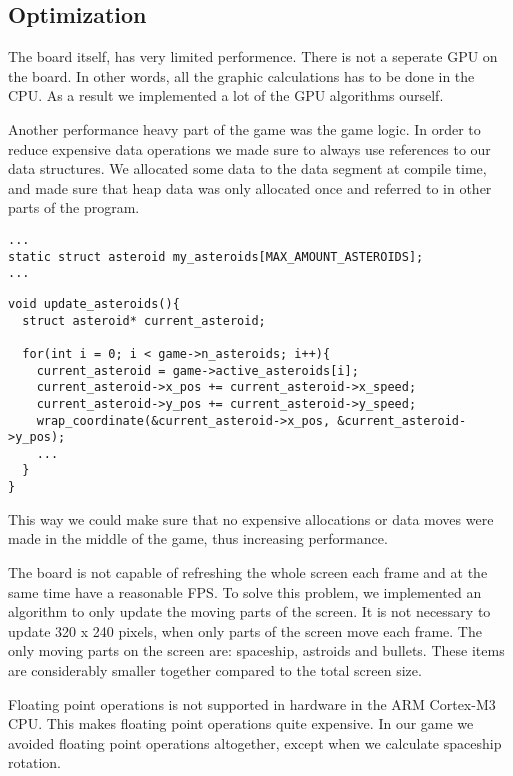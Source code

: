 \subsection{Optimization}
The board itself, has very limited performence. There is not a seperate GPU on the board. In other words, all the graphic calculations has to be done in the CPU. As a result we implemented a lot of the GPU algorithms ourself. 

Another performance heavy part of the game was the game logic. In order to reduce expensive data operations we made sure to always use references to our data structures. We allocated some data to the data segment at compile time, and made sure that heap data was only allocated once and referred to in other parts of the program.

\begin{lstlisting}[caption=Allocating asteroid data on data segment.,label=lst:Asteroid allocation]
...
static struct asteroid my_asteroids[MAX_AMOUNT_ASTEROIDS];
...
\end{lstlisting}

\begin{lstlisting}[caption=Updating the asteroids using their references.,label=lst:Asteroid updating]
void update_asteroids(){
  struct asteroid* current_asteroid;

  for(int i = 0; i < game->n_asteroids; i++){
    current_asteroid = game->active_asteroids[i];
    current_asteroid->x_pos += current_asteroid->x_speed;
    current_asteroid->y_pos += current_asteroid->y_speed;
    wrap_coordinate(&current_asteroid->x_pos, &current_asteroid->y_pos);
    ...
  }
}
\end{lstlisting}

This way we could make sure that no expensive allocations or data moves were made in the middle of the game, thus increasing performance.

The board is not capable of refreshing the whole screen each frame and at the same time have a reasonable FPS. To solve this problem, we implemented an algorithm to only update the moving parts of the screen. It is not necessary to update 320 x 240 pixels, when only parts of the screen move each frame. The only moving parts on the screen are: spaceship, astroids and bullets. These items are considerably smaller together compared to the total screen size.

Floating point operations is not supported in hardware in the ARM Cortex-M3 CPU. This makes floating point operations quite expensive. In our game we avoided floating point operations altogether, except when we calculate spaceship rotation.

